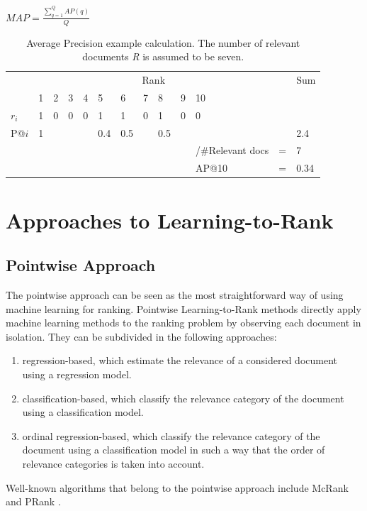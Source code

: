 $MAP = \frac{\sum\nolimits_{q=1}^{Q}AP(q)}{Q}$\\

\begin{table}
\begin{tabular}{lllllllllllll}
 & \multicolumn{10}{c}{Rank} &  & Sum \\ 
\cline{2-11}
 & 1 & 2 & 3 & 4 & 5 & 6 & 7 & 8 & 9 & 10 &  &  \\ 
\hline
$r_i$ & 1 & 0 & 0 & 0 & 1 & 1 & 0 & 1 & 0 & 0 &  &  \\ 
P@$i$ & 1 &  &  &  & 0.4 & 0.5 &  & 0.5 &  &  &  & 2.4 \\ 
\hline
 &  &  &  &  &  &  &  &  &  & /\#Relevant docs & = & 7 \\ 
 &  &  &  &  &  &  &  &  &  & AP@10 & = & 0.34 \\ 
\end{tabular}
\caption{Average Precision example calculation. The number of relevant documents \emph{R} is assumed to be seven.}
\label{tab:example_calculation_AP}
\end{table}

\section{Approaches to Learning-to-Rank}
\label{sec:ltr_approaches}
\subsection{Pointwise Approach}
The pointwise approach can be seen as the most straightforward way of using machine learning for ranking. Pointwise Learning-to-Rank methods directly apply machine learning methods to the ranking problem by observing each document in isolation. They can be subdivided in the following approaches:
	\begin{enumerate}
	\item regression-based, which estimate the relevance of a considered document using a regression model.
	\item classification-based, which classify the relevance category of the document using a classification model.
	\item ordinal regression-based, which classify the relevance category of the document using a classification model in such a way that the order of relevance categories is taken into account. 
	\end{enumerate}
Well-known algorithms that belong to the pointwise approach include McRank \cite{Li2007} and PRank \cite{Crammer2001}.
